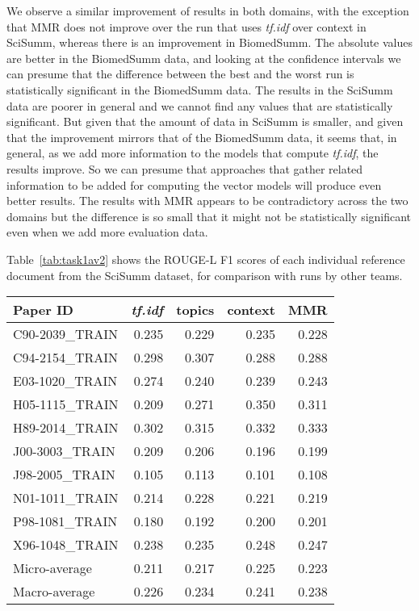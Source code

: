 \documentclass[11pt]{article}
\begin{document}
We observe a similar improvement of results in both domains, with the
exception that MMR does not improve over the run that uses
\emph{tf.idf} over context in SciSumm, whereas there is an improvement
in BiomedSumm. The absolute values are better in the BiomedSumm data,
and looking at the confidence intervals we can presume that the
difference between the best and the worst run is statistically
significant in the BiomedSumm data. The results in the SciSumm data
are poorer in general and we cannot find any values that are
statistically significant. But given that the amount of data in
SciSumm is smaller, and given that the improvement mirrors that of the
BiomedSumm data, it seems that, in general, as we add more information
to the models that compute \emph{tf.idf}, the results improve. So we
can presume that approaches that gather related information to be
added for computing the vector models will produce even better
results. The results with MMR appears to be contradictory across the
two domains but the difference is so small that it might not be
statistically significant even when we add more evaluation data.

Table~\ref{tab:task1av2} shows the ROUGE-L F1 scores of each
individual reference document from the SciSumm dataset, for comparison
with runs by other teams.

\begin{table*}
  \centering
  \begin{tabular}{l|rrrr}
Paper ID & \emph{tf.idf} & topics & context & MMR\\
\hline
C90-2039\_TRAIN & 0.235 & 0.229 & 0.235 & 0.228\\
C94-2154\_TRAIN & 0.298 & 0.307 & 0.288 & 0.288\\
E03-1020\_TRAIN & 0.274 & 0.240 & 0.239 & 0.243\\
H05-1115\_TRAIN & 0.209 & 0.271 & 0.350 & 0.311\\
H89-2014\_TRAIN & 0.302 & 0.315 & 0.332 & 0.333\\
J00-3003\_TRAIN & 0.209 & 0.206 & 0.196 & 0.199\\
J98-2005\_TRAIN & 0.105 & 0.113 & 0.101 & 0.108\\
N01-1011\_TRAIN & 0.214 & 0.228 & 0.221 & 0.219\\
P98-1081\_TRAIN & 0.180 & 0.192 & 0.200 & 0.201\\
X96-1048\_TRAIN & 0.238 & 0.235 & 0.248 & 0.247\\
\hline
Micro-average & 0.211 & 0.217 & 0.225 & 0.223\\
Macro-average & 0.226 & 0.234 & 0.241 & 0.238

  \end{tabular}
  \caption{ROUGE-L F1 results for individual SciSumm reference papers for task
  1a}
  \label{tab:task1av2}
\end{table*}
\end{document}
